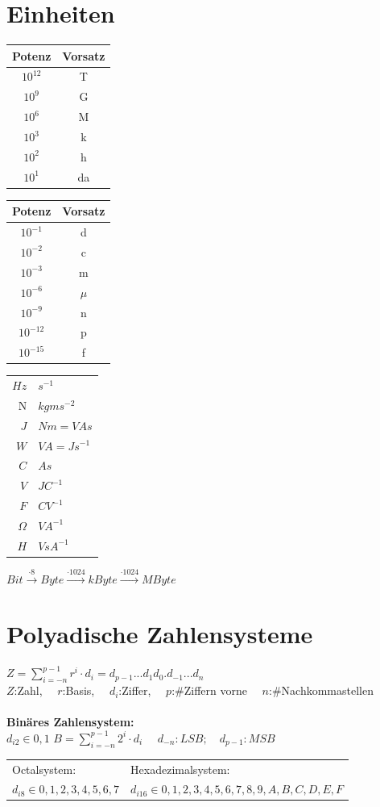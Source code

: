 \documentclass[6pt,a4paper]{scrartcl}
\begin{document}
\begin{multicols*}{3}
\section{Einheiten}
\begin{multicols}{3}
\begin{tabular}{c | c}
	Potenz & Vorsatz \\ \midrule
	$10^{12}$ & T \\
	$10^{9}$ & G \\
	$10^{6}$ & M \\
	$10^{3}$ & k \\
	$10^{2}$ & h \\
	$10^{1}$ & da
\end{tabular}
\begin{tabular}{c | c}
	Potenz & Vorsatz \\ \midrule
	$10^{-1}$ & d \\
	$10^{-2}$ & c \\
	$10^{-3}$ & m \\
	$10^{-6}$ & $\mu$	\\
	$10^{-9}$ & n \\
	$10^{-12}$ & p \\
	$10^{-15}$ & f
\end{tabular}
\begin{tabular}{ r | l }
$Hz$ & $s^{-1}$ \\
N & $kg m s^{-2} $ \\
$J $ & $ N m = V A s$\\
$W $ & $ V A  = J s^{-1} $ \\
$ C $ & $ A s $ \\
$V $ & $ J C^{-1} $\\
$F $ & $ C V^{-1} $ \\
$\Omega $ & $ V A^{-1} $\\
$ H $ & $ V s  A^{-1}$
\end{tabular}
\end{multicols}
$Bit \xrightarrow{\cdot 8} Byte \xrightarrow{\cdot 1024} kByte \xrightarrow{\cdot 1024} MByte$\\

\section{Polyadische Zahlensysteme}
$Z = \sum\limits^{p-1}_{i = -n} r^i \cdot d_i = d_{p-1}...d_1 d_0 . d_{-1} ... d_n$\\
$Z$:Zahl, \ \ $r$:Basis, \ \ $d_i$:Ziffer, \ \ $p$:\#Ziffern vorne \ \ $n$:\#Nachkommastellen\\\\
\textbf{Binäres Zahlensystem:}\\
$d_{i2} \in {0,1}$ \qquad
$B = \sum\limits_{i=-n}^{p-1} 2^i \cdot d_i$ $\quad d_{-n}: LSB; \quad d_{p-1}: MSB$ \\
\begin{tabular}{l|l}
Octalsystem: & Hexadezimalsystem:\\
$d_{i8} \in {0,1,2,3,4,5,6,7}$ & $d_{i16} \in {0,1,2,3,4,5,6,7,8,9,A,B,C,D,E,F}$\\
\end{tabular}\\
\\


\end{multicols*}
\end{document}

